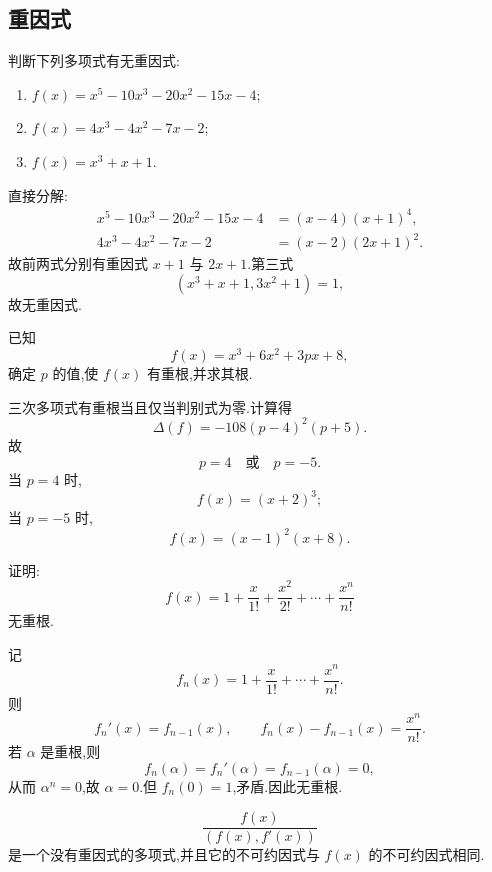 \subsection{重因式}

\begin{example}
判断下列多项式有无重因式:
\begin{enumerate}
  \item $f(x)=x^5-10x^3-20x^2-15x-4$;
  \item $f(x)=4x^3-4x^2-7x-2$;
  \item $f(x)=x^3+x+1$.
\end{enumerate}
\end{example}
\exampleblank

\begin{solution}
直接分解:
\[
\begin{aligned}
  x^5-10x^3-20x^2-15x-4&=(x-4)(x+1)^4,\\
  4x^3-4x^2-7x-2&=(x-2)(2x+1)^2.
\end{aligned}
\]
故前两式分别有重因式 $x+1$ 与 $2x+1$.第三式
\[
  (x^3+x+1,3x^2+1)=1,
\]
故无重因式.
\end{solution}

\begin{example}
已知
\[
  f(x)=x^3+6x^2+3px+8,
\]
确定 $p$ 的值,使 $f(x)$ 有重根,并求其根.
\end{example}
\exampleblank

\begin{solution}
三次多项式有重根当且仅当判别式为零.计算得
\[
  \Delta(f)=-108(p-4)^2(p+5).
\]
故
\[
  p=4\quad\text{或}\quad p=-5.
\]
当 $p=4$ 时,
\[
  f(x)=(x+2)^3;
\]
当 $p=-5$ 时,
\[
  f(x)=(x-1)^2(x+8).
\]
\end{solution}

\begin{example}[\markstar]
证明:
\[
  f(x)=1+\dfrac{x}{1!}+\dfrac{x^2}{2!}+\cdots+\dfrac{x^n}{n!}
\]
无重根.
\end{example}
\exampleblank

\begin{solution}
记
\[
  f_n(x)=1+\dfrac{x}{1!}+\cdots+\dfrac{x^n}{n!}.
\]
则
\[
  f_n'(x)=f_{n-1}(x),
  \qquad
  f_n(x)-f_{n-1}(x)=\dfrac{x^n}{n!}.
\]
若 $\alpha$ 是重根,则
\[
  f_n(\alpha)=f_n'(\alpha)=f_{n-1}(\alpha)=0,
\]
从而 $\alpha^n=0$,故 $\alpha=0$.但 $f_n(0)=1$,矛盾.因此无重根.
\end{solution}

\begin{proposition}[\markstar]
\[
  \dfrac{f(x)}{(f(x),f'(x))}
\]
是一个没有重因式的多项式,并且它的不可约因式与 $f(x)$ 的不可约因式相同.
\end{proposition}

